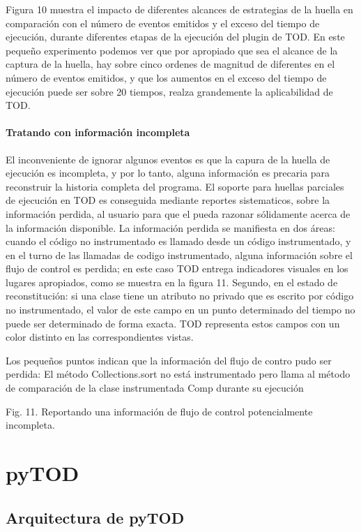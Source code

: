 \documentclass[12pt,legalpaper]{report}
\begin{document}
Figura 10 muestra el impacto de diferentes alcances de estrategias de la huella en comparación con el número de eventos emitidos y el exceso del tiempo de ejecución, durante diferentes etapas de la ejecución del plugin de TOD.  En este pequeño experimento podemos ver que por apropiado que sea el alcance de la captura de la huella, hay sobre cinco ordenes de magnitud de diferentes en el número de eventos emitidos, y que los aumentos en el exceso del tiempo de ejecución puede ser sobre 20 tiempos, realza grandemente la aplicabilidad de TOD.

			\subsubsection{Tratando con información incompleta}

El inconveniente de ignorar algunos eventos es que la capura de la huella de ejecución es incompleta, y por lo tanto, alguna información es precaria para reconstruir la historia completa del programa.  El soporte para huellas parciales de ejecución en TOD es conseguida mediante reportes sistematicos, sobre la información perdida, al usuario para que el pueda razonar sólidamente acerca de la información disponible.  La información perdida se manifiesta en dos áreas: cuando el código no instrumentado es llamado desde un código instrumentado, y en el turno de las llamadas de codigo instrumentado, alguna información sobre el flujo de control es perdida; en este caso TOD entrega indicadores visuales en los lugares apropiados, como se muestra en la figura 11.  Segundo, en el estado de reconstitución: si una clase tiene un atributo no privado que es escrito por código no instrumentado, el valor de este campo en un punto determinado del tiempo no puede ser determinado de forma exacta.  TOD representa estos campos con un color distinto en las correspondientes vistas.


Los pequeños puntos indican que la información del flujo de contro pudo ser perdida: El método Collections.sort no está instrumentado pero llama al método de comparación de la clase instrumentada Comp durante su ejecución

         Fig. 11. Reportando una información de flujo de control potencialmente incompleta.


\chapter{pyTOD}
	\section{Arquitectura de pyTOD}
\end{document}
